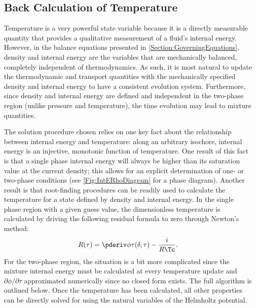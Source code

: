 \subsection{Back Calculation of Temperature}
Temperature is a very powerful state variable because it is a directly measurable quantity that provides a qualitative measurement of a fluid's internal energy.
However, in the balance equations presented in \cref{Section:GoverningEquations}, density and internal energy are the variables that are mechanically balanced, completely independent of thermodynamics. 
As such, it is most natural to update the thermodynamic and transport quantities with the mechanically specified density and internal energy to have a consistent evolution system.
Furthermore, since density and internal energy are defined and independent in the two-phase region (unlike pressure and temperature), the time evolution may lead to mixture quantities.

The solution procedure chosen relies on one key fact about the relationship between internal energy and temperature: 
along an arbitrary isochore, internal energy is an injective, monotonic function of temperature.
One result of this fact is that a single phase internal energy will always be higher than its saturation value at the current density; this allows for an explicit determination of one- or two-phase conditions (see \cref{Fig:IntERhoDiagram} for a phase diagram).
Another result is that root-finding procedures can be readily used to calculate the temperature for a state defined by density and internal energy.
In the single phase region with a given guess value, the dimensionless temperature is calculated by driving the following residual formula to zero through Newton's method:
\begin{equation}
    R(\tau) = \phit(\delta,\tau) - \frac{i}{R\Tc}.
    \label{Eqn:SinglePhaseResidualForTemperature}
\end{equation}
For the two-phase region, the situation is a bit more complicated since the mixture internal energy must be calculated at every temperature update and $\partial\phi/\partial\tau$ approximated numerically since no closed form exists.
The full algorithm is outlined below.
Once the temperature has been calculated, all other properties can be directly solved for using the natural variables of the Helmholtz potential.

